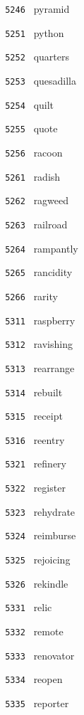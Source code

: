 \documentclass[11pt]{article}
\begin{document}
\begin{multicols}{6}
\noindent \texttt{ 5246 } pyramid  \par
\vspace{3mm}
\noindent \texttt{ 5251 } python  \par
\noindent \texttt{ 5252 } quarters  \par
\noindent \texttt{ 5253 } quesadilla  \par
\noindent \texttt{ 5254 } quilt  \par
\noindent \texttt{ 5255 } quote  \par
\noindent \texttt{ 5256 } racoon  \par
\vspace{3mm}
\noindent \texttt{ 5261 } radish  \par
\noindent \texttt{ 5262 } ragweed  \par
\noindent \texttt{ 5263 } railroad  \par
\noindent \texttt{ 5264 } rampantly  \par
\noindent \texttt{ 5265 } rancidity  \par
\noindent \texttt{ 5266 } rarity  \par
\noindent \texttt{ 5311 } raspberry  \par
\noindent \texttt{ 5312 } ravishing  \par
\noindent \texttt{ 5313 } rearrange  \par
\noindent \texttt{ 5314 } rebuilt  \par
\noindent \texttt{ 5315 } receipt  \par
\noindent \texttt{ 5316 } reentry  \par
\vspace{3mm}
\noindent \texttt{ 5321 } refinery  \par
\noindent \texttt{ 5322 } register  \par
\noindent \texttt{ 5323 } rehydrate  \par
\noindent \texttt{ 5324 } reimburse  \par
\noindent \texttt{ 5325 } rejoicing  \par
\noindent \texttt{ 5326 } rekindle  \par
\vspace{3mm}
\noindent \texttt{ 5331 } relic  \par
\noindent \texttt{ 5332 } remote  \par
\noindent \texttt{ 5333 } renovator  \par
\noindent \texttt{ 5334 } reopen  \par
\noindent \texttt{ 5335 } reporter  \par

\end{multicols}
\end{document}
